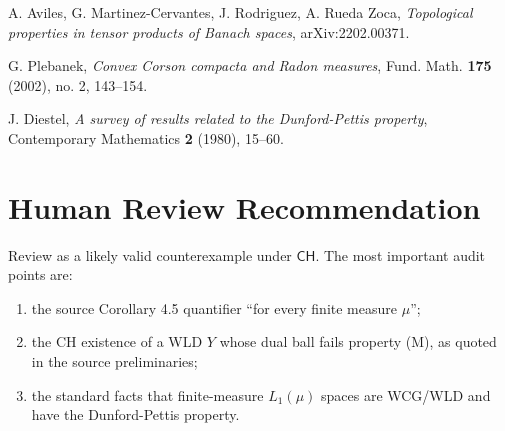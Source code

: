 \documentclass[11pt]{article}
\newcommand{\CH}{\mathsf{CH}}
\begin{document}
\begin{enumerate}[label={[\arabic*]}]
\item A. Aviles, G. Martinez-Cervantes, J. Rodriguez, A. Rueda Zoca,
\emph{Topological properties in tensor products of Banach spaces},
arXiv:2202.00371.
\item G. Plebanek, \emph{Convex Corson compacta and Radon measures},
Fund. Math. \textbf{175} (2002), no. 2, 143--154.
\item J. Diestel, \emph{A survey of results related to the Dunford-Pettis
property}, Contemporary Mathematics \textbf{2} (1980), 15--60.
\end{enumerate}

\section*{Human Review Recommendation}

Review as a likely valid counterexample under \(\CH\).  The most
important audit points are:
\begin{enumerate}[label=(\roman*)]
\item the source Corollary 4.5 quantifier ``for every finite measure \(\mu\)'';
\item the CH existence of a WLD \(Y\) whose dual ball fails property (M), as
quoted in the source preliminaries;
\item the standard facts that finite-measure \(L_1(\mu)\) spaces are WCG/WLD
and have the Dunford-Pettis property.
\end{enumerate}
\end{document}
